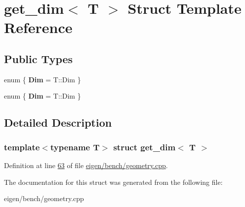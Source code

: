 \hypertarget{structget__dim}{}\section{get\+\_\+dim$<$ T $>$ Struct Template Reference}
\label{structget__dim}
\subsection*{Public Types}
\begin{DoxyCompactItemize}
\item 
\mbox{\label{structget__dim_a841dc7e9cc34c9fd8c890d07d8c3dcd2}} 
enum \{ {\bfseries Dim} = T\+:\+:Dim
 \}
\item 
\mbox{\label{structget__dim_a24aa1ac99d98bb92a13ddf5f7a5cb8f2}} 
enum \{ {\bfseries Dim} = T\+:\+:Dim
 \}
\end{DoxyCompactItemize}


\subsection{Detailed Description}
\subsubsection*{template$<$typename T$>$\newline
struct get\+\_\+dim$<$ T $>$}



Definition at line \hyperlink{eigen_2bench_2geometry_8cpp_source_l00063}{63} of file \hyperlink{eigen_2bench_2geometry_8cpp_source}{eigen/bench/geometry.\+cpp}.



The documentation for this struct was generated from the following file\+:\begin{DoxyCompactItemize}
\item 
eigen/bench/geometry.\+cpp\end{DoxyCompactItemize}
